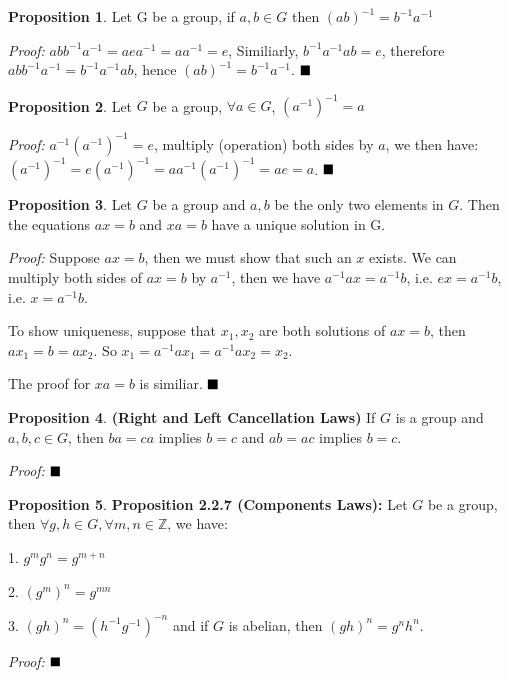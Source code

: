 \documentclass[12pt,openany]{book}
\theoremstyle{definition}
\newtheorem{proposition}{Proposition}[section]
\theoremstyle{definition}
\begin{document}
\begin{proposition}
Let G be a group, if $a, b \in G$ then $(ab)^{-1} = b^{-1}a^{-1}$
\end{proposition}
\textit{Proof:} $abb^{-1}a^{-1} = aea^{-1} = aa^{-1} = e $, Similiarly, $b^{-1}a^{-1}ab = e$, therefore $abb^{-1}a^{-1} = b^{-1}a^{-1}ab $, hence $(ab)^{-1} = b^{-1}a^{-1}$. $\hfill\blacksquare$

\begin{proposition}
Let $G$ be a group, $\forall a \in G$, $(a^{-1})^{-1}=a$
\end{proposition}
\textit{Proof:} $a^{-1}(a^{-1})^{-1} = e$, multiply (operation) both sides by $a$, we then have: $(a^{-1})^{-1} = e(a^{-1})^{-1} = aa^{-1}(a^{-1})^{-1} = ae = a $. $\hfill\blacksquare$

\begin{proposition}
Let $G$ be a group and $a, b$ be the only two elements in $G$. Then the equations $ax=b$ and $xa=b$ have a unique solution in G.
\end{proposition}
\textit{Proof:} Suppose $ax=b$, then we must show that such an $x$ exists. We can multiply both sides of $ax=b$ by $a^{-1}$, then we have $a^{-1}ax = a^{-1}b$, i.e. $ex = a^{-1}b$, i.e. $x = a^{-1}b$.

To show uniqueness, suppose that $x_{1},x_{2}$ are both solutions of $ax=b$, then $ax_{1}=b=ax_{2}$. So $x_{1}=a^{-1}ax_{1} = a^{-1}ax_{2}=x_{2}$.

The proof for $xa=b$ is similiar. $\hfill\blacksquare$

\begin{proposition}
\noindent\textbf{(Right and Left Cancellation Laws)} If $G$ is a group and $a,b,c \in G$, then $ba=ca$ implies $b=c$ and $ab=ac$ implies $b=c$.
\end{proposition}

\textit{Proof:} $\hfill\blacksquare$

\begin{proposition}
\noindent\textbf{Proposition 2.2.7 (Components Laws):} Let $G$ be a group, then $\forall g,h \in G, \forall m,n \in \mathbb{Z}$, we have:

1. $g^{m}g^{n}=g^{m+n}$

2. $(g^{m})^{n} = g^{mn}$

3. $ (gh)^{n} = (h^{-1}g^{-1})^{-n} $ and if $G$ is abelian, then $(gh)^{n} = g^nh^n$.
\end{proposition}

\textit{Proof:} $\hfill\blacksquare$
\end{document}
